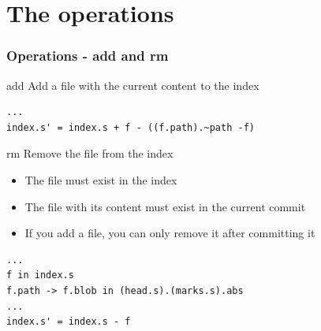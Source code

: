\documentclass{beamer}
\begin{document}



\section{The operations}
\begin{frame}[fragile]
   \frametitle{Operations - add and rm}
   \begin{block}{add}
      Add a file with the current content to the index
   \end{block}
   \tiny
   \begin{lstlisting}
...
index.s' = index.s + f - ((f.path).~path -f)
   \end{lstlisting}
   \normalsize
   \begin{block}{rm}
      Remove the file from the index
      \begin{itemize}
	\item The file must exist in the index
	\item The file with its content must exist in the current commit
	\item If you add a file, you can only remove it after committing it 
      \end{itemize}
   \end{block}
   \tiny
   \begin{lstlisting}
...
f in index.s
f.path -> f.blob in (head.s).(marks.s).abs
...
index.s' = index.s - f
   \end{lstlisting}
\end{frame}
\end{document}
